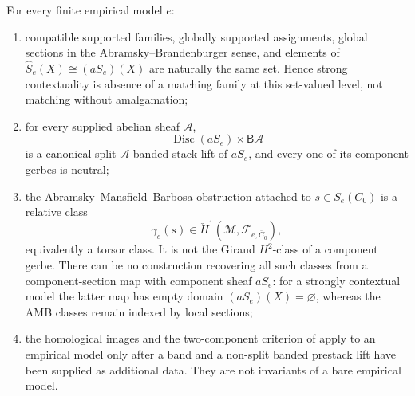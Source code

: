 \begin{theorem}
\label{thm:empirical-model-boundary}
For every finite empirical model \(e\):
\begin{enumerate}[label=(\roman*),nosep]
\item compatible supported families, globally supported assignments, global
      sections in the Abramsky--Brandenburger sense, and elements of
      \(\widehat S_e(X)\cong(aS_e)(X)\) are naturally the same set.  Hence
      strong contextuality is absence of a matching family at this
      set-valued level, not matching without amalgamation;
\item for every supplied abelian sheaf \(\mathscr A\),
      \[
      \operatorname{Disc}(aS_e)\times\mathsf B\mathscr A
      \]
      is a canonical split \(\mathscr A\)-banded stack lift of \(aS_e\),
      and every one of its component gerbes is neutral;
\item the Abramsky--Mansfield--Barbosa obstruction attached to
      \(s\in S_e(C_0)\) is a relative class
      \[
      \gamma_e(s)\in
      \check H^1(\mathcal M,\mathcal F_{e,\overline C_0}),
      \]
      equivalently a torsor class.  It is not the Giraud \(H^2\)-class of a
      component gerbe.  There can be no construction recovering all such
      classes from a component-section map with component sheaf \(aS_e\):
      for a strongly contextual model the latter map has empty domain
      \((aS_e)(X)=\varnothing\), whereas the AMB classes remain indexed by
      local sections;
\item the homological images and the two-component criterion of
       apply to an empirical
      model only after a band and a non-split banded prestack lift have been
      supplied as additional data.  They are not invariants of a bare
      empirical model.
\end{enumerate}
\end{theorem}

